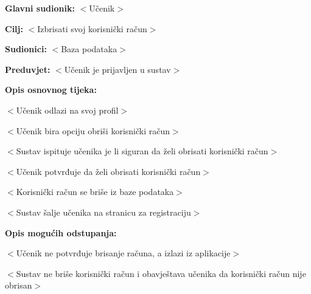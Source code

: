 					\noindent {}
					\begin{packed_item}
	
						\item \textbf{Glavni sudionik: }$<$Učenik$>$
						\item  \textbf{Cilj:} $<$Izbrisati svoj korisnički račun$>$
						\item  \textbf{Sudionici:} $<$Baza podataka$>$
						\item  \textbf{Preduvjet:} $<$Učenik je prijavljen u sustav$>$
						\item  \textbf{Opis osnovnog tijeka:}
						
						\item[] \begin{packed_enum}
	
							\item $<$Učenik odlazi na svoj profil$>$
							\item $<$Učenik bira opciju obriši korisnički račun$>$
							\item $<$Sustav ispituje učenika je li siguran da želi obrisati korisnički račun$>$
							\item $<$Učenik potvrđuje da želi obrisati korisnički račun$>$
							\item $<$Korisnički račun se briše iz baze podataka$>$
							\item $<$Sustav šalje učenika na stranicu za registraciju$>$
						\end{packed_enum}
						
						\item  \textbf{Opis mogućih odstupanja:}
						
						\item[] \begin{packed_item}
	
							\item[2.a] $<$Učenik ne potvrđuje brisanje računa, a izlazi iz aplikacije$>$
							\item[] \begin{packed_enum}
								
								\item $<$Sustav ne briše korisnički račun i obavještava učenika da korisnički račun nije obrisan$>$
								
							\end{packed_enum}
							
						\end{packed_item}
					\end{packed_item}

